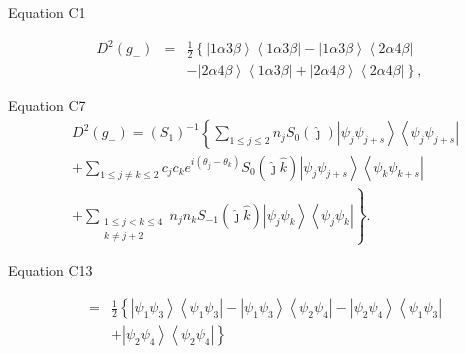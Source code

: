 \documentclass{article}
\begin{document}
Equation C1

\begin{eqnarray*}
D^{2}\left( g_{-}\right)  &=&\frac{1}{2}\left\{ \left\vert 1\alpha 3\beta
\right\rangle \left\langle 1\alpha 3\beta \right\vert -\left\vert 1\alpha
3\beta \right\rangle \left\langle 2\alpha 4\beta \right\vert \right.  \\
&&-\left. \left\vert 2\alpha 4\beta \right\rangle \left\langle 1\alpha
3\beta \right\vert +\left\vert 2\alpha 4\beta \right\rangle \left\langle
2\alpha 4\beta \right\vert \right\} ,
\end{eqnarray*}

Equation C7%
\begin{align*}
& D^{2}\left( g_{-}\right) =\left( S_{1}\right) ^{-1}\left\{ \sum_{1\leq
j\leq 2}n_{j}S_{0}\left( \hat{\jmath}\right) \left\vert \psi _{j}\psi
_{j+s}\right\rangle \left\langle \psi _{j}\psi _{j+s}\right\vert \right.  \\
& +\sum_{1\leq j\neq k\leq 2}c_{j}c_{k}e^{i\left( \theta _{j}-\theta
_{k}\right) }S_{0}\left( \hat{\jmath}\hat{k}\right) \left\vert \psi _{j}\psi
_{j+s}\right\rangle \left\langle \psi _{k}\psi _{k+s}\right\vert  \\
& \left. +\sum_{\substack{ 1\leq j<k\leq 4 \\ k\neq j+2}}n_{j}n_{k}S_{-1}%
\left( \hat{\jmath}\hat{k}\right) \left\vert \psi _{j}\psi _{k}\right\rangle
\left\langle \psi _{j}\psi _{k}\right\vert \right\} .
\end{align*}

Equation C13

\begin{eqnarray*}
&=&\frac{1}{2}\left\{ \left\vert \psi _{1}\psi _{3}\right\rangle
\left\langle \psi _{1}\psi _{3}\right\vert -\left\vert \psi _{1}\psi
_{3}\right\rangle \left\langle \psi _{2}\psi _{4}\right\vert -\left\vert
\psi _{2}\psi _{4}\right\rangle \left\langle \psi _{1}\psi _{3}\right\vert
\right.  \\
&&+\left. \left\vert \psi _{2}\psi _{4}\right\rangle \left\langle \psi
_{2}\psi _{4}\right\vert \right\} 
\end{eqnarray*}
\end{document}

